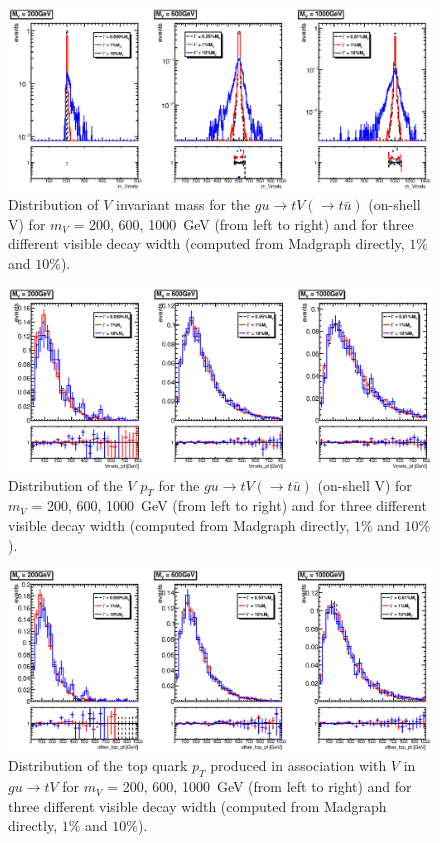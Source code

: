 \begin{figure}[!h!tpd]
	\centering
	\includegraphics[width=1.0\textwidth]{figures/singletop/m_Vmets}
	\caption{
		Distribution of $V$ invariant mass for the $gu\to tV(\to t\bar{u})$ (on-shell V) 
		for $m_V$ = {200, 600, 1000}~GeV (from left to right) and for three different
		visible decay width (computed from Madgraph directly, $1\%$ and $10\%$).
	}   
	\label{fig:appB:Vmass}
\end{figure}


\begin{figure}[!h!tpd]
	\centering
	\includegraphics[width=1.0\textwidth]{figures/singletop/Vmets_pt}
	\caption{
		Distribution of the $V$ $p_T$ for the $gu\to tV(\to t\bar{u})$ (on-shell V) for $m_V$ = {200, 600, 1000}~GeV (from left to right) and for three different
		visible decay width (computed from Madgraph directly, $1\%$ and $10\%$).
	}
	\label{fig:appB:pTV}
\end{figure}


\begin{figure}[!h!tpd]
	\centering
	\includegraphics[width=1.0\textwidth]{figures/singletop/other_top_pt}
	\caption{
		Distribution of the top quark $p_T$ produced in association with $V$ in $gu\to tV$ for $m_V$ = {200, 600, 1000}~GeV (from left to right) and for three different
		visible decay width (computed from Madgraph directly, $1\%$ and $10\%$).
	}
	\label{fig:appB:pTtop}
\end{figure}

